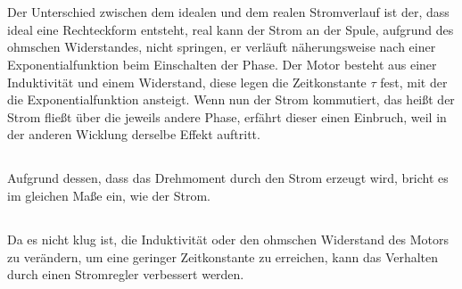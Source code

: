 \chapter{}\label{ex:aufg6}
%
\section{}\label{sec:aufg6a}
%
Der Unterschied zwischen dem idealen und dem realen Stromverlauf ist der, dass ideal eine Rechteckform entsteht, real kann der Strom an der Spule, aufgrund des ohmschen Widerstandes, nicht springen, er verläuft näherungsweise nach einer Exponentialfunktion beim Einschalten der Phase. Der Motor besteht aus einer Induktivität und einem Widerstand, diese legen die Zeitkonstante $\tau$ fest, mit der die Exponentialfunktion ansteigt. Wenn nun der Strom kommutiert, das heißt der Strom fließt über die jeweils andere Phase, erfährt dieser einen Einbruch,  weil in der anderen Wicklung derselbe Effekt auftritt.
%
\section{}\label{sec:aufg6b}
%
Aufgrund dessen, dass das Drehmoment durch den Strom erzeugt wird, bricht es im gleichen Maße ein, wie der Strom.
%
\section{}\label{sec:aufg6c}
%
Da es nicht klug ist, die Induktivität oder den ohmschen Widerstand des Motors zu verändern, um eine geringer Zeitkonstante zu erreichen, kann das Verhalten durch einen Stromregler verbessert werden.